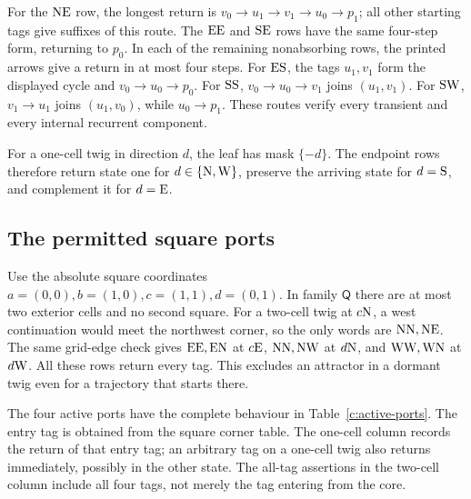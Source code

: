 For the \(\mathrm{N}\mathrm{E}\) row, the longest return is
\(v_0\to u_1\to v_1\to u_0\to p_1\); all other starting tags give
suffixes of this route. The \(\mathrm{E}\mathrm{E}\) and \(\mathrm{S}\mathrm{E}\) rows have the
same four-step form, returning to \(p_0\). In each of the remaining
nonabsorbing rows, the printed arrows give a return in at most four steps.
For \(\mathrm{E}\mathrm{S}\), the tags \(u_1,v_1\) form the displayed cycle and
\(v_0\to u_0\to p_0\). For \(\mathrm{S}\mathrm{S}\),
\(v_0\to u_0\to v_1\) joins \((u_1,v_1)\). For \(\mathrm{S}\mathrm{W}\),
\(v_1\to u_1\) joins \((u_1,v_0)\), while \(u_0\to p_1\).
These routes verify every transient and every internal recurrent component.

For a one-cell twig in direction \(d\), the leaf has mask \(\{-d\}\).
The endpoint rows therefore return state one for
\(d\in\{\mathrm{N},\mathrm{W}\}\), preserve the arriving state for \(d=\mathrm{S}\),
and complement it for \(d=\mathrm{E}\).

\subsection*{The permitted square ports}

Use the absolute square coordinates
\(a=(0,0),b=(1,0),c=(1,1),d=(0,1)\). In family \(\mathsf Q\)
there are at most two exterior cells and no second square. For a two-cell
twig at \(c\mathrm{N}\), a west continuation would meet the northwest corner,
so the only words are \(\mathrm{N}\mathrm{N},\mathrm{N}\mathrm{E}\). The same grid-edge check gives
\(\mathrm{E}\mathrm{E},\mathrm{E}\mathrm{N}\) at \(c\mathrm{E}\),
\(\mathrm{N}\mathrm{N},\mathrm{N}\mathrm{W}\) at \(d\mathrm{N}\), and
\(\mathrm{W}\mathrm{W},\mathrm{W}\mathrm{N}\) at \(d\mathrm{W}\).
All these rows return every tag. This excludes an attractor in a dormant
twig even for a trajectory that starts there.

The four active ports have the complete behaviour in
Table~\ref{c:active-ports}. The entry tag is obtained from the square
corner table. The one-cell column records the return of that entry tag;
an arbitrary tag on a one-cell twig also returns immediately, possibly in
the other state. The all-tag assertions in the two-cell column include
all four tags, not merely the tag entering from the core.

